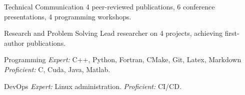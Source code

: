 


\begin{cvskills}


\cvskill
{Technical Communication} %
{4 peer-reviewed publications, 6 conference presentations, 4 programming workshops.} %


\cvskill
{Research and Problem Solving} %
{Lead researcher on 4 projects, achieving first-author publications. } %


\cvskill
{Programming} %
{\textit{Expert:} C++, Python, Fortran, CMake, Git, Latex, Markdown \textit{Proficient:} C, Cuda, Java, Matlab.} %


\cvskill
{DevOps} %
{\textit{Expert:} Linux administration. \textit{Proficient:} CI/CD.}


\end{cvskills}
